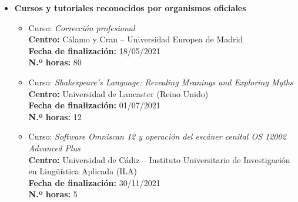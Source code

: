 \begin{enumerate}[label=\alph*)]
\begin{itemize}
\begin{itemize}[label=\textbullet]
    \item Jornada: \textit{XXIV Jornada de la Asociación Española de Terminología: «Terminología y Lexicografía: recursos digitales, plataformas tecnológicas y diccionarios especializados}\\
  \textbf{Centro:} Universidad de Cádiz – Facultad de Filosofía y Letras
  \hfill 6/11/2025\\
  \textbf{N.º horas:} 10

  \item Seminario: \textit{I Seminario de HHDD
aplicadas a la investigación en Literatura y Lengua
Españolas}\\
  \textbf{Centro:} Universidad de Málaga – Departamento de Filología Española, Italiana, Románica y
Teoría de la Literatura y Literatura Comparada y Ciencias y
Técnicas Historiográficas
  \hfill 16/12/2025\\
  \textbf{N.º horas:} 2
  
  \end{itemize}

\item \textbf{Cursos y tutoriales reconocidos por organismos oficiales}

\begin{itemize}[label=\textbullet]

  \item Curso: \textit{Corrección profesional}\\
  \textbf{Centro:} Cálamo y Cran -- Universidad Europea de Madrid\\
  \hfill \textbf{Fecha de finalización:} 18/05/2021\\
  \textbf{N.º horas:} 80

  \item Curso: \textit{Shakespeare's Language: Revealing Meanings and Exploring Myths}\\
  \textbf{Centro:} Universidad de Lancaster (Reino Unido)\\
  \hfill \textbf{Fecha de finalización:} 01/07/2021\\
  \textbf{N.º horas:} 12

  \item Curso: \textit{Software Omniscan 12 y operación del escáner cenital OS 12002 Advanced Plus}\\
  \textbf{Centro:} Universidad de Cádiz -- Instituto Universitario de Investigación en Lingüística Aplicada (ILA)\\
  \hfill \textbf{Fecha de finalización:} 30/11/2021\\
  \textbf{N.º horas:} 5


\end{itemize}
\end{itemize}
\end{enumerate}
